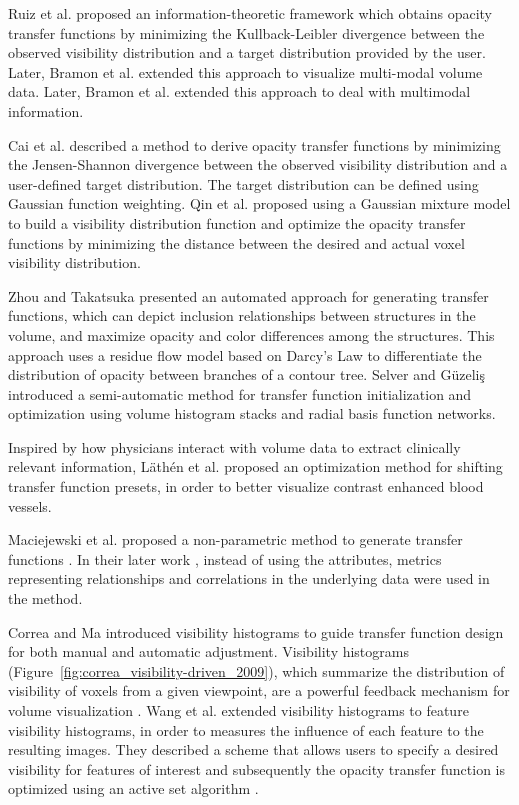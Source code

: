 \documentclass{egpubl}
\begin{document}
Ruiz et al. \cite{ruiz_automatic_2011} proposed an information-theoretic framework which obtains opacity transfer functions by minimizing the Kullback-Leibler divergence between the observed visibility distribution and a target distribution provided by the user. Later, Bramon et al. \cite{bramon_information_2013} extended this approach to visualize multi-modal volume data.
Later, Bramon et al. \cite{bramon_information_2013} extended this approach to deal with multimodal information.

Cai et al. \cite{cai_automatic_2013} described a method to derive opacity transfer functions by minimizing the Jensen-Shannon divergence between the observed visibility distribution and a user-defined target distribution. The target distribution can be defined using Gaussian function weighting.
Qin et al. \cite{qin_voxel_2015} proposed using a Gaussian mixture model to build a visibility distribution function and optimize the opacity transfer functions by minimizing the distance between the desired and actual voxel visibility distribution.

Zhou and Takatsuka \cite{zhou_automatic_2009} presented an automated approach for generating transfer functions, which can depict inclusion relationships between structures in the volume, and maximize opacity and color differences among the structures. This approach uses a residue flow model based on Darcy's Law to differentiate the distribution of opacity between branches of a contour tree.
Selver and G{\"u}zeli{\c s} \cite{alper_selver_semiautomatic_2009} introduced a semi-automatic method for transfer function initialization and optimization using volume histogram stacks and radial basis function networks.

Inspired by how physicians interact with volume data to extract clinically relevant information, L{\"a}th{\'e}n et al. \cite{lathen_automatic_2012} proposed an optimization method for shifting transfer function presets, in order to better visualize contrast enhanced blood vessels.

Maciejewski et al. proposed a non-parametric method to generate transfer functions \cite{maciejewski_structuring_2009}.
In their later work \cite{maciejewski_abstracting_2013}, instead of using the attributes, metrics representing relationships and correlations in the underlying data were used in the method.

Correa and Ma \cite{correa_visibility-driven_2009} introduced visibility histograms to guide transfer function design for both manual and automatic adjustment.
Visibility histograms (Figure~\ref{fig:correa_visibility-driven_2009}), which summarize the distribution of visibility of voxels from a given viewpoint, are a powerful feedback mechanism for volume visualization \cite{emsenhuber_visibility_2008}.
Wang et al. \cite{wang_efficient_2011} extended visibility histograms to feature visibility histograms, in order to measures the influence of each feature to the resulting images. They described a scheme that allows users to specify a desired visibility for features of interest and subsequently the opacity transfer function is optimized using an active set algorithm \cite{polyak_conjugate_1969}.
\end{document}
